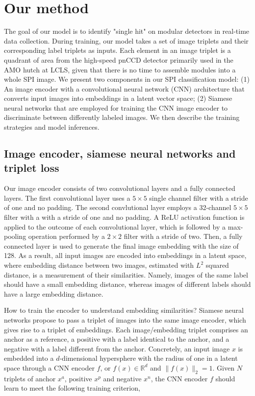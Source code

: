 \section{Our method}

The goal of our model is to identify "single hit" on modular detectors in
real-time data collection.  During training, our model takes a set of image
triplets and their corresponding label triplets as inputs.  Each element in an
image triplet is a quadrant of area from the high-speed pnCCD detector primarily
used in the AMO hutch at LCLS, given that there is no time to assemble modules
into a whole SPI image.  We present two components in our SPI classification
model: (1) An image encoder with a convolutional neural network (CNN)
architecture that converts input images into embeddings in a latent vector space;
(2) Siamese neural networks that are employed for training the CNN image encoder
to discriminate between differently labeled images.  We then describe the
training strategies and model inferences.  


\subsection{Image encoder, siamese neural networks and triplet loss}

Our image encoder consists of two convolutional layers and a fully connected
layers.  The first convolutional layer uses a $5 \times 5$ single channel filter
with a stride of one and no padding.  The second convlutional layer employs a
32-channel $5 \times 5$ filter with a with a stride of one and no padding.  A
ReLU activation function is applied to the outcome of each convolutional layer,
which is followed by a max-pooling operation performed by a $2\times 2$ filter
with a stride of two.  Then, a fully connected layer is used to generate the
final image embedding with the size of 128.  As a result, all input images are
encoded into embeddings in a latent space, where embedding distance between two
images, estimated with $L^2$ squared distance, is a measurement of their
similarities.  Namely, images of the same label should have a small embedding
distance, whereas images of different labels should have a large embedding
distance.  


How to train the encoder to understand embedding similarities?  Siamese neural
networks propose to pass a triplet of images into the same image encoder, which
gives rise to a triplet of embeddings.  Each image/embedding triplet comprises
an anchor as a reference, a positive with a label identical to the anchor, and a
negative with a label different from the anchor.  Concretely, an
input image $x$ is embedded into a $d$-dimensional hypersphere with the radius
of one in a latent space through a CNN encoder $f$, or $f(x) \in \mathbb{R}^d$
and $\|f(x)\|_2=1$.  Given $N$ triplets of anchor $x^a$, positive $x^p$ and
negative $x^n$, the CNN encoder $f$ should learn to meet the following training
criterion,

